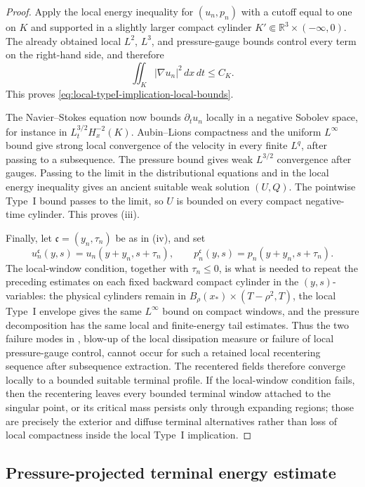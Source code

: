\documentclass[11pt]{amsart}
\numberwithin{equation}{section}
\theoremstyle{plain}
\theoremstyle{definition}
\theoremstyle{remark}
\newcommand{\R}{\mathbb R}
\begin{document}
\begin{proof}
Apply the local energy inequality for \((u_n,p_n)\) with a cutoff equal to one
on \(K\) and supported in a slightly larger compact cylinder
\(K'\Subset\R^3\times(-\infty,0)\).  The already obtained local \(L^2\),
\(L^3\), and pressure-gauge bounds control every term on the right-hand side,
and therefore
\[
   \iint_K |\nabla u_n|^2\,dx\,dt\le C_K .
\]
This proves \eqref{eq:local-typeI-implication-local-bounds}.

The Navier--Stokes equation now bounds \(\partial_tu_n\) locally in a negative
Sobolev space, for instance in \(L^{3/2}_tH^{-2}_x(K)\).  Aubin--Lions
compactness and the uniform \(L^\infty\) bound give strong local convergence of
the velocity in every finite \(L^q\), after passing to a subsequence.  The
pressure bound gives weak \(L^{3/2}\) convergence after gauges.  Passing to the
limit in the distributional equations and in the local energy inequality gives
an ancient suitable weak solution \((U,Q)\).  The pointwise Type~I bound passes
to the limit, so \(U\) is bounded on every compact negative-time cylinder.
This proves (iii).

Finally, let \(\mathfrak c=(y_n,\tau_n)\) be as in (iv), and set
\[
   u_n^{\mathfrak c}(y,s)=u_n(y+y_n,s+\tau_n),
   \qquad
   p_n^{\mathfrak c}(y,s)=p_n(y+y_n,s+\tau_n).
\]
The local-window condition, together with \(\tau_n\le0\), is what is
needed to repeat the preceding estimates on each fixed backward compact cylinder
in the \((y,s)\)-variables: the
physical cylinders remain in \(B_\rho(x_*)\times(T-\rho^2,T)\), the local
Type~I envelope gives the same \(L^\infty\) bound on compact windows, and the
pressure decomposition has the same local and finite-energy tail estimates.
Thus the two failure modes in , blow-up of the
local dissipation measure or failure of local pressure-gauge control, cannot
occur for such a retained local recentering sequence after subsequence
extraction.  The recentered fields therefore converge locally to a bounded
suitable terminal profile.  If the local-window condition fails, then the
recentering leaves every bounded terminal window attached to the singular
point, or its critical mass persists only through expanding regions; those are
precisely the exterior and diffuse terminal alternatives rather than loss of
local compactness inside the local Type~I implication.
\end{proof}

\subsection{Pressure-projected terminal energy estimate}
\label{subsec:pressure-projected-terminal-gap}
\end{document}
